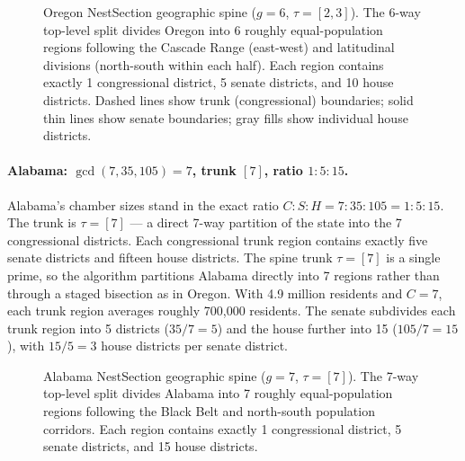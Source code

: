 \begin{figure}[h]
\centering
{}
\caption{Oregon NestSection geographic spine ($g=6$, $\tau=[2,3]$).  The 6-way
top-level split divides Oregon into 6 roughly equal-population regions following
the Cascade Range (east-west) and latitudinal divisions (north-south within
each half).  Each region contains exactly 1 congressional district, 5 senate
districts, and 10 house districts.  Dashed lines show trunk (congressional)
boundaries; solid thin lines show senate boundaries; gray fills show individual
house districts.}
\label{fig:or-spine}
\end{figure}

\paragraph{Alabama: $\gcd(7, 35, 105) = 7$, trunk $[7]$, ratio $1:5:15$.}
Alabama's chamber sizes stand in the exact ratio $C : S : H = 7 : 35 : 105 = 1 : 5 : 15$.
The trunk is $\tau = [7]$ --- a direct 7-way partition of the state into the
7 congressional districts.  Each congressional trunk region contains exactly
five senate districts and fifteen house districts.  The spine trunk $\tau = [7]$
is a single prime, so the algorithm partitions Alabama directly into 7 regions
rather than through a staged bisection as in Oregon.  With 4.9 million residents
and $C = 7$, each trunk region averages roughly 700,000 residents.  The senate
subdivides each trunk region into 5 districts ($35/7 = 5$) and the house further
into 15 ($105/7 = 15$), with $15/5 = 3$ house districts per senate district.

\begin{figure}[h]
\centering
{}
\caption{Alabama NestSection geographic spine ($g=7$, $\tau=[7]$).  The 7-way
top-level split divides Alabama into 7 roughly equal-population regions following
the Black Belt and north-south population corridors.  Each region contains
exactly 1 congressional district, 5 senate districts, and 15 house districts.}
\label{fig:al-spine}
\end{figure}

